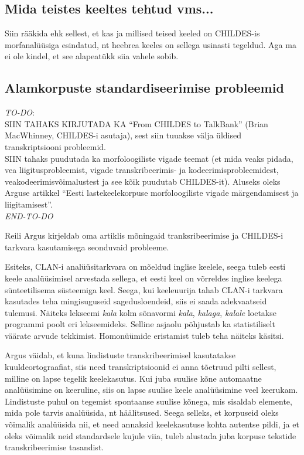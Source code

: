 \documentclass[12pt]{article}
\begin{document}
\subsection{Mida teistes keeltes tehtud vms...}

Siin rääkida ehk sellest, et kas ja millised teised keeled on CHILDES-is morfanalüüsiga esindatud, nt heebrea keeles on sellega usinasti tegeldud. Aga ma ei ole kindel, et see alapeatükk siia vahele sobib. 

\subsection{Alamkorpuste standardiseerimise probleemid}

\emph{TO-DO}:\\
SIIN TAHAKS KIRJUTADA KA ``From CHILDES to TalkBank'' (Brian MacWhinney, CHILDES-i asutaja), sest siin tuuakse välja üldised transkriptsiooni probleemid.\\
SIIN tahaks puudutada ka morfoloogiliste vigade teemat (et mida veaks pidada, vea liigitusprobleemist, vigade transkribeerimis- ja kodeerimisprobleemidest, veakodeerimisvõimalustest ja see kõik puudutab CHILDES-it). Aluseks oleks Arguse artikkel ``Eesti lastekeelekorpuse morfoloogiliste vigade
märgendamisest ja liigitamisest''.\\
\emph{END-TO-DO}

Reili Argus kirjeldab oma artiklis \citep{Argus2007} mõningaid tranksribeerimise ja CHILDES-i tarkvara kasutamisega seonduvaid probleeme.

Esiteks, CLAN-i analüüsitarkvara on mõeldud inglise keelele, seega tuleb eesti keele analüüsimisel arvestada sellega, et eesti keel on võrreldes inglise keelega sünteetilisema süsteemiga keel. Seega, kui keeleuurija tahab CLAN-i tarkvara kasutades teha mingisuguseid sagedusloendeid, siis ei saada adekvaatseid tulemusi. Näiteks lekseemi \emph{kala} kolm sõnavormi \emph{kala}, \emph{kalaga}, \emph{kalale} loetakse programmi poolt eri lekseemideks. Selline asjaolu põhjustab ka statistiliselt väärate arvude tekkimist. Homonüümide eristamist tuleb teha näiteks käsitsi.\citep[70]{Argus2007}

Argus väidab, et kuna lindistuste transkribeerimisel kasutatakse kuuldeortograafiat, siis need transkriptsioonid ei anna tõetruud pilti sellest, milline on lapse tegelik keelekasutus. Kui juba suulise kõne automaatne analüüsimine on keeruline, siis on lapse suulise keele analüüsimine veel keerukam. Lindistuste puhul on tegemist spontaanse suulise kõnega, mis sisaldab elemente, mida pole tarvis analüüsida, nt häälitsused. Seega selleks, et korpuseid oleks võimalik analüüsida nii, et need annaksid keelekasutuse kohta autentse pildi, ja et oleks võimalik neid standardsele kujule viia, tuleb alustada juba korpuse tekstide transkribeerimise tasandist. \citep[71]{Argus2007}
\end{document}
